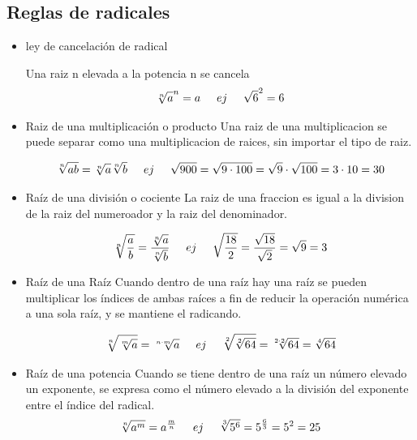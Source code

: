 \documentclass{article}
\newcommand{\ej}{\hspace{0.5cm}ej\hspace{0.5cm}}
\begin{document}
	\subsection{Reglas de radicales}
	\begin{itemize}
		\item{ley de cancelación de radical}
		
		Una raiz n elevada a la potencia n se cancela
		\begin{equation*}
			\sqrt[n]{a}^n = a  \hspace{0.5cm}ej\hspace{0.5cm} \sqrt{6}^2 = 6
		\end{equation*}
		
		
		\item{Raiz de una multiplicación o producto}
		Una raiz de una multiplicacion se puede separar como una multiplicacion de raices, sin importar el tipo de raiz.
		
		\begin{equation*}
			\sqrt[n]{ab} = \sqrt[n]{a}\sqrt[n]{b}  \hspace{0.5cm}ej\hspace{0.5cm} \sqrt{900} = \sqrt{9 \cdot 100} = \sqrt{9} \cdot \sqrt{100} = 3 \cdot 10 = 30
		\end{equation*}
		
		\item{Raíz de una división o cociente}
		La raiz de una fraccion es igual a la division de la raiz del numeroador y la raiz del denominador.
		
		\begin{equation*}
			\sqrt[n]{\frac{a}{b}} = \frac{\sqrt[n]{a}}{\sqrt[n]{b}}  \hspace{0.5cm}ej\hspace{0.5cm} \sqrt{\frac{18}{2}} = \frac{\sqrt{18}}{\sqrt{2}} = \sqrt{9} = 3 
		\end{equation*}
		
		\item{Raíz de una Raíz}
		Cuando dentro de una raíz hay una raíz se pueden multiplicar los índices de ambas raíces a fin de reducir la operación numérica a una sola raíz, y se mantiene el radicando.
		
		\begin{equation*}
			\sqrt[n]{\sqrt[m]{a}} = \sqrt[n \cdot m]{a} \hspace{0.5cm}ej\hspace{0.5cm} \sqrt[2]{\sqrt[2]{64}} = \sqrt[2 \cdot 2]{64} = \sqrt[4]{64} 
		\end{equation*}
		
		\item{Raíz de una potencia}
		Cuando se tiene dentro de una raíz un número elevado un exponente, se expresa como el número elevado a la división del exponente entre el índice del radical.
		\begin{equation*}
			\sqrt[n]{a^m} = a^{\frac{m}{n}} \ej \sqrt[3]{5^6} = 5^{\frac{6}{3}} = 5^2 = 25
		\end{equation*}
		\pagebreak
		
	\end{itemize}
	
\end{document}
